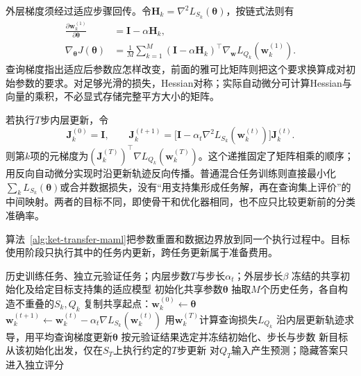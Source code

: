 外层梯度须经过适应步骤回传。令$\bm H_k=\nabla^2L_{S_k}(\bm{\theta})$，按链式法则有
\begin{align}
  \frac{\partial\bm w_k^{(1)}}{\partial\bm{\theta}}
     &=\bm I-\alpha\bm H_k, \nonumber\\
  \nabla_{\bm{\theta}}J(\bm{\theta})
     &=\frac{1}{M}\sum_{k=1}^{M}
       (\bm I-\alpha\bm H_k)^{\top}
       \nabla_{\bm w}L_{Q_k}(\bm w_k^{(1)}).
       \label{eq:ket-transfer-maml-chain}
\end{align}
查询梯度指出适应后参数应怎样改变，前面的雅可比矩阵则把这个要求换算成对初始参数的要求。对足够光滑的损失，Hessian对称；实际自动微分可计算Hessian与向量的乘积，不必显式存储完整平方大小的矩阵。

若执行$T$步内层更新，令
\[
  \bm J_k^{(0)}=\bm I,\qquad
  \bm J_k^{(t+1)}
  =\bigl[\bm I-\alpha_t\nabla^2L_{S_k}(\bm w_k^{(t)})\bigr]
    \bm J_k^{(t)}.
\]
则第$k$项的元梯度为$(\bm J_k^{(T)})^\top\nabla L_{Q_k}(\bm w_k^{(T)})$。这个递推固定了矩阵相乘的顺序；用反向自动微分实现时沿更新轨迹反向传播。普通混合任务训练则直接最小化$\sum_kL_{S_k}(\bm{\theta})$或合并数据损失，没有“用支持集形成任务解，再在查询集上评价”的中间映射。两者的目标不同，即使骨干和优化器相同，也不应只比较更新前的分类准确率。

算法~\ref{alg:ket-transfer-maml}把参数重置和数据边界放到同一个执行过程中。目标使用阶段只执行其中的任务内更新，跨任务更新属于准备费用。

\begin{algorithm}[MAML的准备与目标适应]
  \label{alg:ket-transfer-maml}
  \begin{algorithmic}[1]
    \Require 历史训练任务、独立元验证任务；内层步数$T$与步长$\alpha_t$；外层步长$\beta$
    \Ensure 冻结的共享初始化及给定目标支持集的适应模型
    \State 初始化共享参数$\bm{\theta}$
      \State 抽取$M$个历史任务，各自构造不重叠的$S_k,Q_k$
        \State 复制共享起点：$\bm w_k^{(0)}\gets\bm{\theta}$
          \State $\bm w_k^{(t+1)}\gets\bm w_k^{(t)}
            -\alpha_t\nabla L_{S_k}(\bm w_k^{(t)})$
        \EndFor
        \State 用$\bm w_k^{(T)}$计算查询损失$L_{Q_k}$
      \EndFor
      \State 沿内层更新轨迹求导，用平均查询梯度更新$\bm{\theta}$
    \EndWhile
    \State 按元验证结果选定并冻结初始化、步长与步数
    \State 新目标从该初始化出发，仅在$S_T$上执行约定的$T$步更新
    \State 对$Q_T$输入产生预测；隐藏答案只进入独立评分
  \end{algorithmic}
\end{algorithm}

